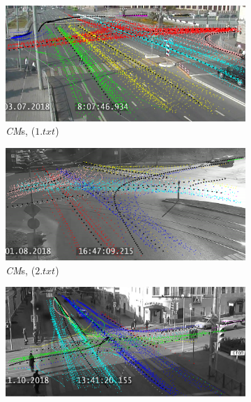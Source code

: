 \begin{figure}[!htb]
	\centering
	\begin{subfigure}[!htb]{0.23\textwidth}
		\centering{}
		\includegraphics[width=\textwidth]{images/cm-res/cm-res-1-rdp-n-diff-coeff-1.png}
		\caption{\textit{CM}s, ($1.txt$)}
		\label{fig:cm-res-1-rdp-n-diff-coeff-1}
	\end{subfigure}
	\hfill
	\begin{subfigure}[!htb]{0.23\textwidth}
		\centering{}
		\includegraphics[width=\textwidth]{images/cm-res/cm-res-1-rdp-n-diff-coeff-2.png}
		\caption{\textit{CM}s, ($2.txt$)}
		\label{fig:cm-res-1-rdp-n-diff-coeff-2}
	\end{subfigure}
	\hfill
	\begin{subfigure}[!htb]{0.23\textwidth}
		\centering{}
		\includegraphics[width=\textwidth]{images/cm-res/cm-res-1-rdp-n-diff-coeff-3.png}

\end{subfigure}
\end{figure}
